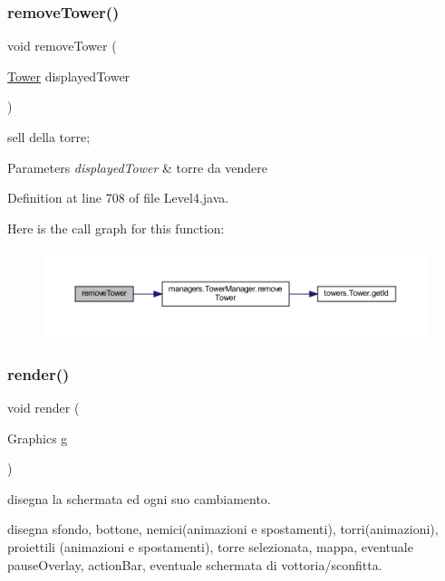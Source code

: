 \subsubsection{\texorpdfstring{remove\+Tower()}{removeTower()}}
{\footnotesize\ttfamily void remove\+Tower (\begin{DoxyParamCaption}\item[{\hyperlink{classtowers_1_1_tower}{Tower}}]{displayed\+Tower }\end{DoxyParamCaption})}



sell della torre; 


\begin{DoxyParams}{Parameters}
{\em displayed\+Tower} & torre da vendere \\
\hline
\end{DoxyParams}


Definition at line 708 of file Level4.\+java.

Here is the call graph for this function\+:
\nopagebreak
\begin{figure}[H]
\begin{center}
\leavevmode
\includegraphics[width=350pt]{classscenes_1_1_level4_addba85b44e35a186e066b2e801f433c4_cgraph}
\end{center}
\end{figure}
\mbox{\label{classscenes_1_1_level4_a203b6ad9d5e4d54dd1152986eec4dedc}} 
\subsubsection{\texorpdfstring{render()}{render()}}
{\footnotesize\ttfamily void render (\begin{DoxyParamCaption}\item[{Graphics}]{g }\end{DoxyParamCaption})}



disegna la schermata ed ogni suo cambiamento. 

disegna sfondo, bottone, nemici(animazioni e spostamenti), torri(animazioni), proiettili (animazioni e spostamenti), torre selezionata, mappa, eventuale pause\+Overlay, action\+Bar, eventuale schermata di vottoria/sconfitta.


